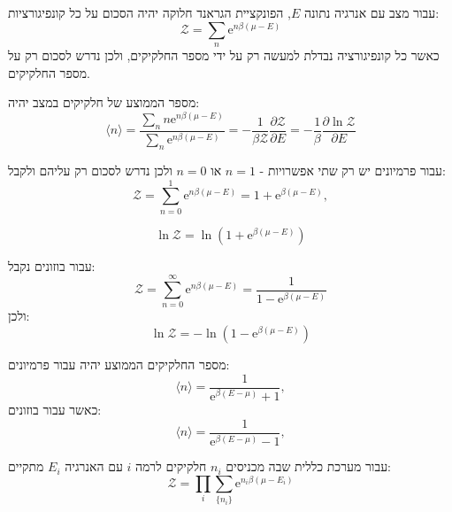 \documentclass{tstextbook}
\begin{document}
\begin{reminder}
עבור מצב עם אנרגיה נתונה \(E\), הפונקציית הגראנד חלוקה יהיה הסכום על כל קונפיגורציות:
$${\mathcal Z}=\sum_{n}\mathrm{e}^{n\beta(\mu-E)}$$
כאשר כל קונפיגורציה נבדלת למעשה רק על ידי מספר החלקיקים, ולכן נדרש לסכום רק על מספר החלקיקים.

\end{reminder}
\begin{proposition}
מספר הממוצע של חלקיקים במצב יהיה:
$$\langle n\rangle=\frac{\sum_{n}n\mathrm{e}^{n\beta(\mu-E)}}{\sum_{n}\mathrm{e}^{n\beta(\mu-E)}}=-\frac{1}{\beta\mathcal{Z}}\frac{\partial\mathcal{Z}}{\partial E}=-\frac{1}{\beta}\frac{\partial\ln\mathcal{Z}}{\partial E}$$

\end{proposition}
\begin{corollary}
עבור פרמיונים יש רק שתי אפשרויות - \(n=1\) או \(n=0\) ולכן נדרש לסכום רק עליהם ולקבל:
$${\mathcal Z}=\sum_{n=0}^{1}\mathrm{e}^{n\beta(\mu-E)}=1+\mathrm{e}^{\beta(\mu-E)},$$

\end{corollary}
\begin{corollary}
$$\ln{\mathcal{Z}}=\ln(1+\mathrm{e}^{\beta(\mu-E)})$$

\end{corollary}
\begin{proposition}
עבור בוזונים נקבל:
$${\mathcal{Z}}=\sum_{n=0}^{\infty}\mathrm{e}^{n\beta(\mu-E)}={\frac{1}{1-\mathrm{e}^{\beta(\mu-E)}}}$$
ולכן:
$$\ln{\mathcal{Z}}=-\ln(1-\mathrm{e}^{\beta(\mu-E)})$$

\end{proposition}
\begin{proposition}
מספר החלקיקים הממוצע יהיה עבור פרמיונים:
$$\langle n\rangle=\frac{1}{\mathrm{e}^{\beta(E-\mu)}+1},$$
כאשר עבור בוזונים:
$$\langle n\rangle=\frac{1}{\mathrm{e}^{\beta(E-\mu)}-1},$$

\end{proposition}
\begin{proposition}
עבור מערכת כללית שבה מכניסים \(n_{i}\) חלקיקים לרמה \(i\) עם האנרגיה \(E_{i}\) מתקיים:
$${\mathcal Z}=\prod_{i}\sum_{\{n_{i}\}}\mathrm{e}^{n_{i}\beta(\mu-E_{i})}$$

\end{proposition}
\end{document}
